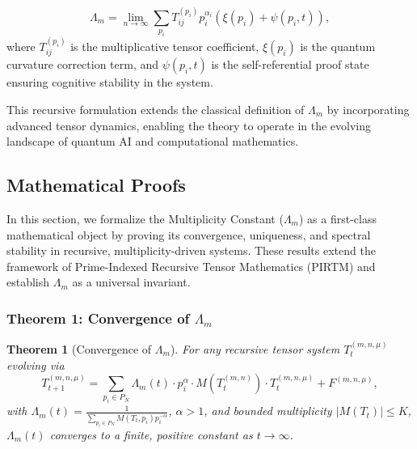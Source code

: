 \documentclass[12pt]{article}
\newtheorem{theorem}{Theorem}[section]
\begin{document}
\[
\Lambda_m = \lim_{n \to \infty} \sum_{p_i} T_{ij}^{(p_i)} p_i^{\alpha_i} \left( \xi(p_i) + \psi(p_i, t) \right),
\]
where $T_{ij}^{(p_i)}$ is the multiplicative tensor coefficient, $\xi(p_i)$ is the quantum curvature correction term, and $\psi(p_i, t)$ is the self-referential proof state ensuring cognitive stability in the system.

This recursive formulation extends the classical definition of $\Lambda_m$ by incorporating advanced tensor dynamics, enabling the theory to operate in the evolving landscape of quantum AI and computational mathematics.




\subsection{Mathematical Proofs}
In this section, we formalize the Multiplicity Constant (\(\Lambda_m\)) as a first-class mathematical object by proving its convergence, uniqueness, and spectral stability in recursive, multiplicity-driven systems. These results extend the framework of Prime-Indexed Recursive Tensor Mathematics (PIRTM) and establish \(\Lambda_m\) as a universal invariant.

\subsubsection{Theorem 1: Convergence of \(\Lambda_m\)}
\begin{theorem}[Convergence of \(\Lambda_m\)]
For any recursive tensor system \( T_t^{(m, n, \mu)} \) evolving via
\[
T_{t+1}^{(m, n, \mu)} = \sum_{p_i \in P_N} \Lambda_m(t) \cdot p_i^\alpha \cdot M(T_t^{(m, n)}) \cdot T_t^{(m, n, \mu)} + F^{(m, n, \mu)},
\]
with \(\Lambda_m(t) = \frac{1}{\sum_{p_i \in P_N} M(T_t, p_i) p_i^{-\alpha}}\), \(\alpha > 1\), and bounded multiplicity \( |M(T_t)| \leq K \), \(\Lambda_m(t)\) converges to a finite, positive constant as \( t \to \infty \).
\end{theorem}
\end{document}
